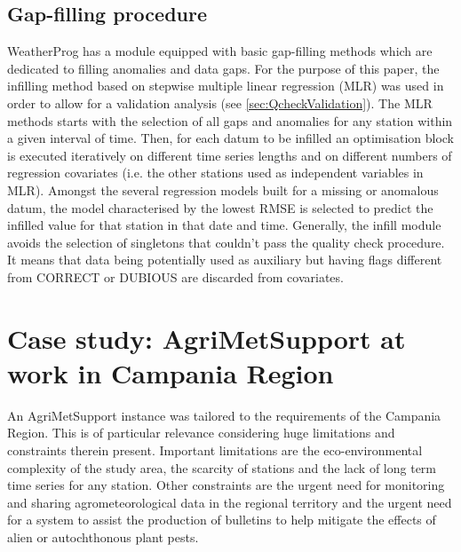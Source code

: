 \documentclass[authoryear,preprint,review,12pt]{elsarticle}
\newcommand{\review}[1]{\emph{\textcolor{cyan}{#1}}}
\begin{document}
\subsection{Gap-filling procedure} \label{sec:infill}

WeatherProg has a module equipped with basic gap-filling methods which are dedicated to filling anomalies and data gaps.
For the purpose of this paper, the infilling method based on stepwise multiple linear regression (MLR) was used in order to allow for a validation analysis (see \cref{sec:QcheckValidation}).
The MLR methods starts with the selection of all gaps and anomalies for any station within a given  interval of time.
Then, for each datum to be infilled an optimisation block is executed iteratively on different time series lengths and on different numbers of regression covariates (i.e. the other stations used as independent variables in MLR).
Amongst the several regression models built for a missing or anomalous datum, the model characterised by the lowest RMSE is selected to predict the infilled value for that station in that date and time.
Generally, the infill module avoids the selection of singletons that couldn't pass the quality check procedure. 
It means that data being potentially used as auxiliary but having flags different from CORRECT or DUBIOUS are discarded from covariates.

\section{Case study: AgriMetSupport at work in Campania Region} \label{sec:casestudy}

An AgriMetSupport instance was tailored to the requirements of the Campania Region.
This is of particular relevance considering huge limitations and constraints therein present.
Important limitations are the eco-environmental complexity of the study area, the scarcity of stations and the lack of long term time series for any station.
Other constraints are the urgent need for monitoring and sharing agrometeorological data in the regional territory %
and the urgent need for a system to assist the production of bulletins to help mitigate the effects of alien or autochthonous plant pests.
 
\end{document}
